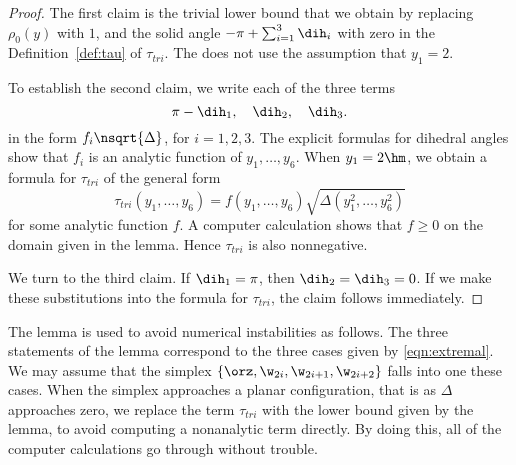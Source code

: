 \begin{proof}
The first claim is the trivial lower bound that we obtain by replacing
$\rho_0(y)$
with $1$, and the solid angle $-\pi+\sum_{i=1}^3 \dih_i$ with zero
in the Definition~\ref{def:tau} of $\tau_{tri}$.  The does not use the
assumption that $y_1=2$.

To establish the second claim, we write each of the three terms 
\[
\pi-\dih_1,\quad\dih_2,\quad \dih_3.
\]
in the form $f_i\nsqrt{\Delta}$, for $i=1,2,3$.  The explicit formulas
for dihedral angles show that $f_i$ is an analytic function of
$y_1,\ldots,y_6$.  When $y_1=2\hm$, we obtain a formula for
$\tau_{tri}$ of the general form
\[
\tau_{tri}(y_1,\ldots,y_6)= f(y_1,\ldots,y_6)\sqrt{\Delta(y_1^2,\ldots,y_6^2)}
\]
for some analytic function $f$.  A computer calculation shows that $f\ge0$
on the domain given in the lemma. Hence $\tau_{tri}$ is also nonnegative.

We turn to the third claim.  If $\dih_1=\pi$, then $\dih_2=\dih_3=0$.
If we make these substitutions into the formula for $\tau_{tri}$, the
claim follows immediately.
\end{proof}

The lemma is used to avoid numerical instabilities as follows.  The
three statements of the lemma correspond to the three cases given by
\eqref{eqn:extremal}.  We may assume that the simplex
$\{\orz,\w_{2i},\w_{2i+1},\w_{2i+2}\}$ falls into one these cases.
When the simplex approaches a planar configuration, that is as
$\Delta$ approaches zero, we replace the term $\tau_{tri}$ with the
lower bound given by the lemma, to avoid computing a nonanalytic
term directly.  By doing this, all of the computer calculations go
through without trouble.
